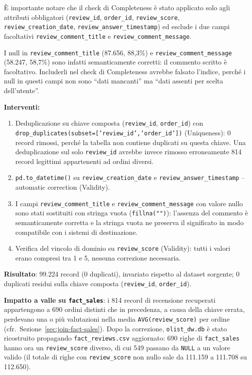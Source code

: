 \documentclass[12pt,a4paper]{article}
\begin{document}
È importante notare che il check di Completeness è stato applicato solo agli
attributi obbligatori (\texttt{review\_id}, \texttt{order\_id}, \texttt{review\_score},
\texttt{review\_creation\_date}, \texttt{review\_answer\_timestamp}) ed esclude i
due campi facoltativi \texttt{review\_comment\_title} e
\texttt{review\_comment\_message}.

I null in \texttt{review\_comment\_title} (87.656, 88,3\%) e
\texttt{review\_comment\_message} (58.247, 58,7\%) sono infatti semanticamente
corretti: il commento scritto è facoltativo. Includerli nel check di Completeness
avrebbe falsato l'indice, perché i null in questi campi non sono ``dati mancanti''
ma ``dati assenti per scelta dell'utente''.

\textbf{Interventi:}
\begin{enumerate}
  \item Deduplicazione su chiave composta (\texttt{review\_id}, \texttt{order\_id})
        con \texttt{drop\_duplicates(}\allowbreak\texttt{subset=['review\_id',}\allowbreak\texttt{'order\_id'])}
        (Uniqueness): 0 record rimossi, perché la tabella non contiene duplicati su
        questa chiave. Una deduplicazione sul solo \texttt{review\_id} avrebbe
        invece rimosso erroneamente 814 record legittimi appartenenti ad ordini
        diversi.
  \item \texttt{pd.to\_datetime()} su \texttt{review\_creation\_date} e
        \texttt{review\_answer\_timestamp} -- automatic correction (Validity).
  \item I campi \texttt{review\_comment\_title} e \texttt{review\_comment\_message}
        con valore nullo sono stati sostituiti con stringa vuota
        (\texttt{fillna("")}): l'assenza del commento è semanticamente corretta e la
        stringa vuota ne preserva il significato in modo compatibile con i sistemi di
        destinazione.
  \item Verifica del vincolo di dominio su \texttt{review\_score} (Validity): tutti
        i valori erano compresi tra 1 e 5, nessuna correzione necessaria.
\end{enumerate}

\textbf{Risultato}: 99.224 record (0 duplicati), invariato rispetto al dataset
sorgente; 0 duplicati residui sulla chiave composta (\texttt{review\_id},
\texttt{order\_id}).

\textbf{Impatto a valle su \texttt{fact\_sales}}: i 814 record di recensione
recuperati appartengono a 690 ordini distinti che in precedenza, a causa della
chiave errata, perdevano una o più valutazioni nella media
\texttt{AVG(review\_score)} per ordine (cfr.\ Sezione~\ref{sec:join-fact-sales}).
Dopo la correzione, \texttt{olist\_dw.db} è stato ricostruito propagando
\texttt{fact\_reviews.csv} aggiornato: 690 righe di \texttt{fact\_sales} hanno
ora un \texttt{review\_score} diverso, di cui 549 passano da \texttt{NULL} a un
valore valido (il totale di righe con \texttt{review\_score} non nullo sale da
111.159 a 111.708 su 112.650).
\end{document}
